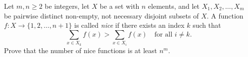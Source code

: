 Let $m,n \geq 2$ be integers, let $X$ be a set with $n$ elements, and let $X_1, X_2, \ldots, X_m$ be pairwise distinct non-empty, not necessary disjoint subsets of $X$. A function $f : X \to \{1,2,\ldots,n+1\}$ is called \emph{nice} if there exists an index $k$ such that
\[
\sum_{x \in X_k} f(x) > \sum_{x \in X_i} f(x) \quad \text{for all } i \neq k.
\]
Prove that the number of nice functions is at least $n^m$.
